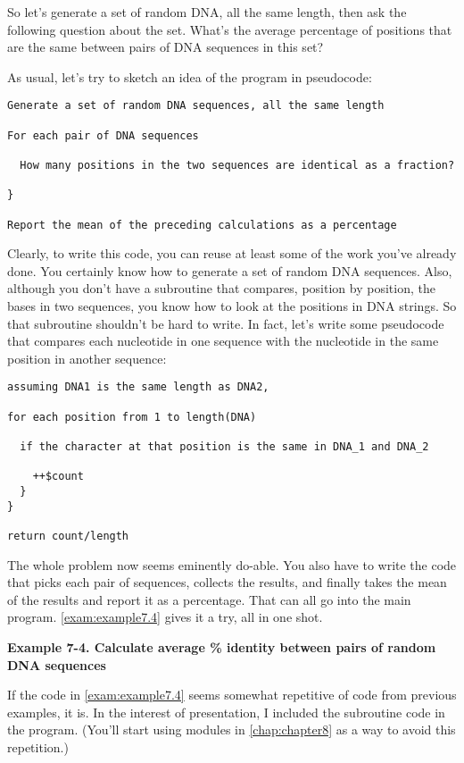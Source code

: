 So let's generate a set of random DNA, all the same length, then ask the following question about the set. What's the average percentage of positions that are the same between pairs of DNA sequences in this set?

As usual, let's try to sketch an idea of the program in pseudocode: 

\begin{lstlisting}
Generate a set of random DNA sequences, all the same length

For each pair of DNA sequences

  How many positions in the two sequences are identical as a fraction?

}

Report the mean of the preceding calculations as a percentage
\end{lstlisting}

Clearly, to write this code, you can reuse at least some of the work you've already done. You certainly know how to generate a set of random DNA sequences. Also, although you don't have a subroutine that compares, position by position, the bases in two sequences, you know how to look at the positions in DNA strings. So that subroutine shouldn't be hard to write. In fact, let's write some pseudocode that compares each nucleotide in one sequence with the nucleotide in the same position in another sequence: 

\begin{lstlisting}
assuming DNA1 is the same length as DNA2,

for each position from 1 to length(DNA)

  if the character at that position is the same in DNA_1 and DNA_2

    ++$count
  }
}

return count/length
\end{lstlisting}

The whole problem now seems eminently do-able. You also have to write the code that picks each pair of sequences, collects the results, and finally takes the mean of the results and report it as a percentage. That can all go into the main program. \autoref{exam:example7.4} gives it a try, all in one shot. 

\textbf{Example 7-4. Calculate average \% identity between pairs of random DNA sequences}


If the code in \autoref{exam:example7.4} seems somewhat repetitive of code from previous examples, it is. In the interest of presentation, I included the subroutine code in the program. (You'll start using modules in \autoref{chap:chapter8} as a way to avoid this repetition.) 

